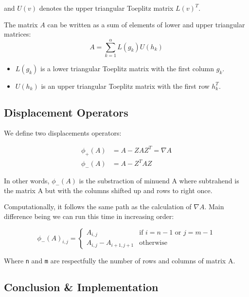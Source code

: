 and $U(v)$ denotes the upper triangular Toeplitz matrix $L(v)^T$.

The matrix $A$ can be written as a sum of elements of lower and upper triangular matrices:
\begin{equation} \label{eq:SigmaLU}
    A = \sum_{k=1}^{\alpha} L(g_k) U(h_k)
\end{equation}
\begin{itemize}
    \item $L(g_k)$ is a lower triangular Toeplitz matrix with the first column $g_k$.
    \item $U(h_k)$ is an upper triangular Toeplitz matrix with the first row $h_k^T$.
\end{itemize}

\subsection{Displacement Operators}

We define two displacements operators:

\begin{equation}
    \begin{aligned}
        \phi_+(A) &= A - Z A Z^T = \nabla A \\
        \phi_-(A) &= A - Z^T A Z
    \end{aligned}
\end{equation}

In other words, $\phi_-(A)$ is the substraction of minuend A where subtrahend is the matrix A but with the columns shifted up and rows to right once.

Computationally, it follows the same path as the calculation of $\nabla A$. Main difference being we can run this time in increasing order:

\begin{equation} \label{imp:phi_minus}
    \phi_-(A)_{i,j} =
    \begin{cases}
        A_{i,j}                & \text{if } i=n-1 \text{ or } j=m-1 \\
        A_{i,j} - A_{i+1, j+1} & \text{otherwise}
    \end{cases}
\end{equation}

Where \texttt{n} and \texttt{m} are respectfully the number of rows and columns of matrix A.

\subsection{Conclusion \& Implementation}


